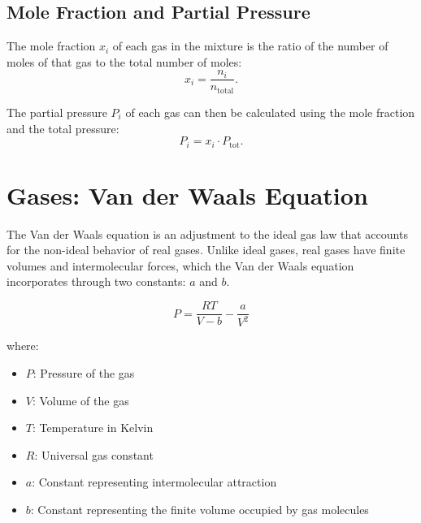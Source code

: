 \documentclass{report}
\begin{document}
\subsection{Mole Fraction and Partial Pressure}

The mole fraction \( x_i \) of each gas in the mixture is the ratio of the number of moles of that gas to the total number of moles:
\[
	x_i = \frac{n_i}{n_{\text{total}}}.
\]

The partial pressure \( P_i \) of each gas can then be calculated using the mole fraction and the total pressure:
\[
	P_i = x_i \cdot P_{\text{tot}}.
\]


\section{Gases: Van der Waals Equation}

The Van der Waals equation is an adjustment to the ideal gas law that accounts for the non-ideal behavior of real gases. Unlike ideal gases, real gases have finite volumes and intermolecular forces, which the Van der Waals equation incorporates through two constants: \( a \) and \( b \).

\begin{equation}
	P = \frac{RT}{V - b} - \frac{a}{V^2}
\end{equation}

where:
\begin{itemize}
	\item \( P \): Pressure of the gas
	\item \( V \): Volume of the gas
	\item \( T \): Temperature in Kelvin
	\item \( R \): Universal gas constant
	\item \( a \): Constant representing intermolecular attraction
	\item \( b \): Constant representing the finite volume occupied by gas molecules
\end{itemize}
\end{document}
